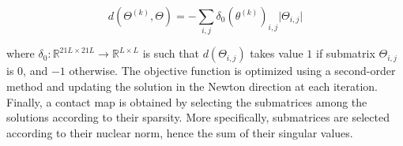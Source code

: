         \begin{equation}
            d(\Theta^{(k)}, \Theta) = - \sum\limits_{i, j} \delta_0(\theta^{(k)})_{i, j} \vert \Theta_{i, j} \vert
        \end{equation}

        where $\delta_0: \mathbb{R}^{21L \times 21L} \rightarrow \mathbb{R}^{L \times L}$ is such that 
        $d(\Theta_{i, j})$ takes value $1$ if submatrix $\Theta_{i, j}$ is $0$, and $-1$ otherwise.
        The objective function is optimized using a second-order method and updating the solution in the Newton direction at each iteration.
        Finally, a contact map is obtained by selecting the submatrices among the solutions according to their sparsity.
        More specifically, submatrices are selected according to their nuclear norm, hence the sum of their singular values.
